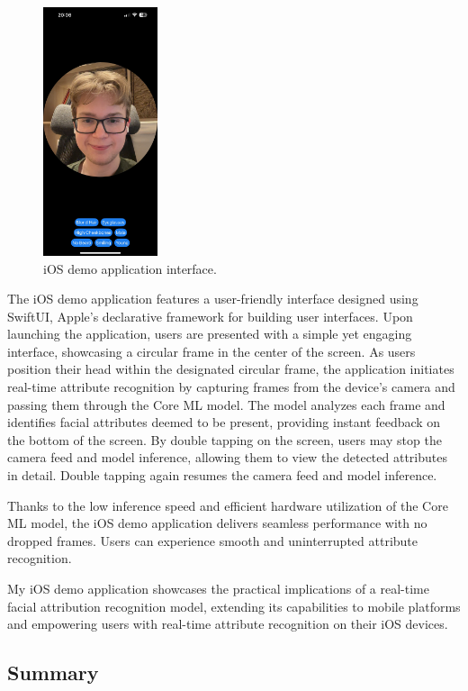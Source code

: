 \documentclass[a4paper,oneside]{article}
\begin{document}
\begin{figure}
  \includegraphics[width=0.3\textwidth]{iOSapp.jpeg}
  \centering
  \caption{iOS demo application interface.}
  \centering
\end{figure}

The iOS demo application features a user-friendly interface designed using SwiftUI, Apple's declarative framework for building user interfaces.
Upon launching the application, users are presented with a simple yet engaging interface, showcasing a circular frame in the center of the screen.
As users position their head within the designated circular frame, the application initiates real-time attribute recognition by capturing frames from the device's camera and passing them through the Core ML model.
The model analyzes each frame and identifies facial attributes deemed to be present, providing instant feedback on the bottom of the screen.
By double tapping on the screen, users may stop the camera feed and model inference, allowing them to view the detected attributes in detail.
Double tapping again resumes the camera feed and model inference.

Thanks to the low inference speed and efficient hardware utilization of the Core ML model, the iOS demo application delivers seamless performance with no dropped frames.
Users can experience smooth and uninterrupted attribute recognition.

My iOS demo application showcases the practical implications of a real-time facial attribution recognition model, extending its capabilities to mobile platforms and empowering users with real-time attribute recognition on their iOS devices.

\clearpage
\subsection{Summary}
\label{sec:summary}
\end{document}
